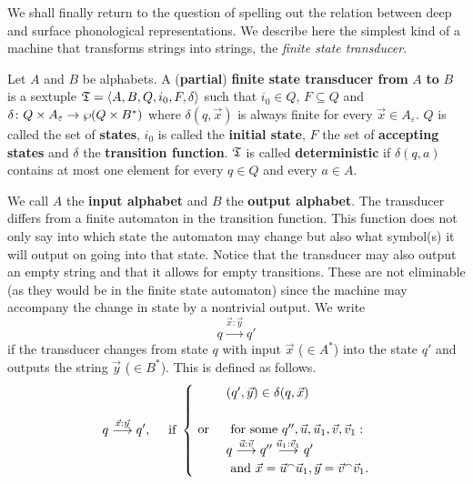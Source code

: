 We shall finally return to the question of spelling out the
relation between deep and surface phonological representations.
We describe here the simplest kind of a machine that transforms
strings into strings, the {\it finite state transducer}.
\begin{defn}
Let $A$ and $B$ be alphabets. A (\textbf{partial}) 
\textbf{finite state transducer from} $A$ \textbf{to} $B$ is a 
sextuple $\mathfrak{T} = \langle A, B, Q, i_0, F, \delta\rangle$ such that $i_0 \in Q$,
$F \subseteq Q$ and $\delta \colon Q \times A_{\varepsilon}
\rightarrow \wp(Q \times B^{\ast})$ where $\delta(q,\vec{x})$ is always
finite for every $\vec{x} \in A_{\varepsilon}$. $Q$ is called the
set of \textbf{states}, 
$i_0$ is called the \textbf{initial state},
$F$ the set of \textbf{accepting states} 
and $\delta$ the \textbf{transition function}. 
$\mathfrak{T}$ is called \textbf{deterministic}
if $\delta(q,a)$ contains at most one element for every
$q \in Q$ and every $a \in A$.
\end{defn}
We call $A$ the \textbf{input alphabet} and $B$ the
\textbf{output alphabet}. The transducer differs from a finite
automaton in the transition function. This function does
not only say into which state the automaton may change but
also what symbol(s) it will output on going into that state.
Notice that the transducer may also output an empty string
and that it allows for empty transitions. These are not
eliminable (as they would be in the finite state automaton)
since the machine may accompany the change in state by a
nontrivial output. We write
\begin{equation}
q \stackrel{\vec{x} : \vec{y}}{\longrightarrow} q'
\end{equation}
if the transducer changes from state $q$ with input
$\vec{x}$ ($\in A^{\ast}$) into the state
$q'$ and outputs the string $\vec{y}$ ($\in B^{\ast}$).
This is defined as follows.
\begin{equation}
q \stackrel{\vec{x} : \vec{y}}{\longrightarrow} q', \quad
\mbox{ if }
\begin{cases}
 & (q',\vec{y}) \in \delta(q,\vec{x}) \\
 \\
\text{ or } &
 \text{ for some $q'', \vec{u}, \vec{u}_1, \vec{v}, \vec{v}_1:$} \\
 & q    \stackrel{\vec{u} : \vec{v}}{\longrightarrow} q''
    \stackrel{\vec{u}_1 : \vec{v}_1}{\longrightarrow} q'
\\
 & \text{ and
	$\vec{x} = \vec{u}{^{\smallfrown}}\vec{u}_1, \vec{y} = \vec{v} {^{\smallfrown}} \vec{v}_1$.}
\end{cases}
\end{equation}
